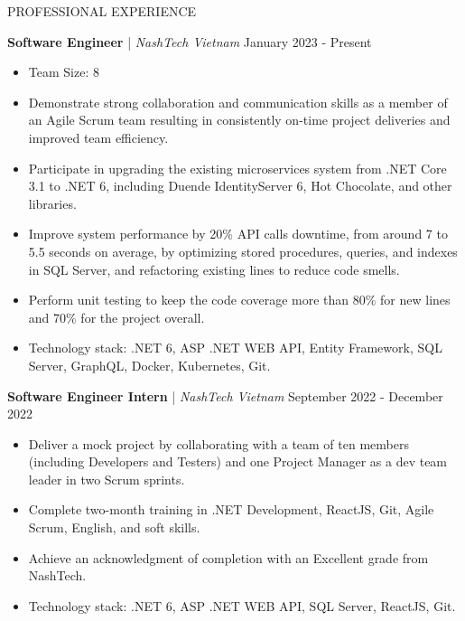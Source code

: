 \begin{rSection}{PROFESSIONAL EXPERIENCE}

    \quad\textbf{Software Engineer} | \textit{NashTech Vietnam} \hfill January 2023 - Present\\
    \begin{itemize}
        \itemsep 0pt {} \vspace{-1em}
        \item Team Size: 8
        \item Demonstrate strong collaboration and communication skills as a member of an Agile Scrum team
              resulting in consistently on-time project deliveries and improved team efficiency.
        \item Participate in upgrading the existing microservices system from .NET Core 3.1 to .NET 6,
              including Duende IdentityServer 6, Hot Chocolate, and other libraries.
        \item Improve system performance by 20\% API calls downtime, from around 7 to 5.5 seconds on average,
              by optimizing stored procedures, queries, and indexes in SQL Server, and refactoring existing lines to reduce code smells.
        \item Perform unit testing to keep the code coverage more than 80\% for new lines and 70\% for the project overall.
        \item Technology stack: .NET 6, ASP .NET WEB API, Entity Framework, SQL Server, GraphQL, Docker, Kubernetes, Git.
    \end{itemize}

    \vspace{1em}

    \quad\textbf{Software Engineer Intern} | \textit{NashTech Vietnam} \hfill September 2022 - December 2022\\
    \begin{itemize}
        \itemsep 0pt {} \vspace{-1em}
        \item Deliver a mock project by collaborating with a team of ten members (including Developers and Testers)
              and one Project Manager as a dev team leader in two Scrum sprints.
        \item Complete two-month training in .NET Development, ReactJS, Git, Agile Scrum, English, and soft skills.
        \item Achieve an acknowledgment of completion with an Excellent grade from NashTech.
        \item Technology stack: .NET 6, ASP .NET WEB API, SQL Server, ReactJS, Git.
    \end{itemize}


\end{rSection}
